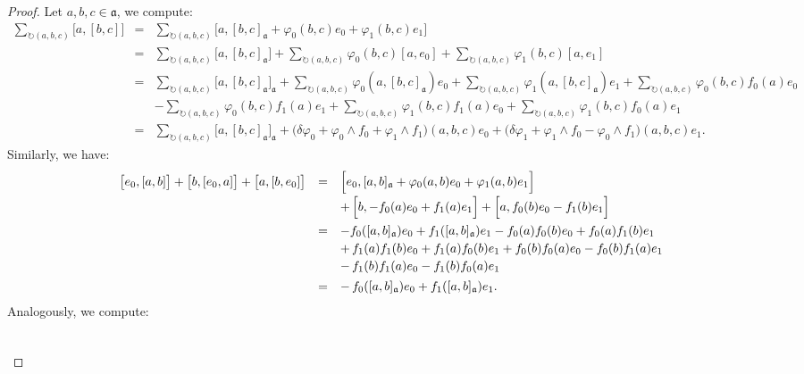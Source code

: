 \documentclass[10pt,a4paper]{amsart}
\newcommand{\ai}{\mathfrak{a}}
\begin{document}
\begin{proof}
	Let $a,b,c\in\ai$, we compute:
	\begin{eqnarray*}
		\sum_{\circlearrowright (a,b,c)} \big[a,[b,c]\big]&=&\sum_{\circlearrowright (a,b,c)} \Big[a,[b,c]_\ai+\varphi_0(b,c)e_0+\varphi_1(b,c)e_1\Big]\\
		&=&\sum_{\circlearrowright (a,b,c)} \big[a,[b,c]_\ai\big]+\sum_{\circlearrowright (a,b,c)} \varphi_0(b,c)[a,e_0]+\sum_{\circlearrowright (a,b,c)} \varphi_1(b,c)[a,e_1]\\
		&=&\sum_{\circlearrowright (a,b,c)} \big[a,[b,c]_\ai\big]_\ai+\sum_{\circlearrowright (a,b,c)} \varphi_0(a,[b,c]_\ai)e_0+\sum_{\circlearrowright (a,b,c)} \varphi_1(a,[b,c]_\ai)e_1+\sum_{\circlearrowright (a,b,c)}\varphi_0(b,c)f_0(a)e_0\\
		&&-\sum_{\circlearrowright (a,b,c)}\varphi_0(b,c)f_1(a)e_1+\sum_{\circlearrowright (a,b,c)}\varphi_1(b,c)f_1(a)e_0+\sum_{\circlearrowright (a,b,c)}\varphi_1(b,c)f_0(a)e_1\\
		&=&\sum_{\circlearrowright (a,b,c)} \big[a,[b,c]_\ai\big]_\ai+\big(\delta\varphi_0+\varphi_0\wedge f_0+\varphi_1\wedge f_1\big)(a,b,c)e_0+\big(\delta\varphi_1+\varphi_1\wedge f_0-\varphi_0\wedge f_1\big)(a,b,c)e_1.
	\end{eqnarray*}
	Similarly, we have:
	\begin{equation*}
\begin{array}{r c l}\vspace{0.75mm}
\big[e_0,[a,b]\big]+\big[b,[e_0,a]\big]+\big[a,[b,e_0]\big]&=&\Big[e_0,[a,b]_\ai+\varphi_0(a,b)e_0+\varphi_1(a,b)e_1\Big]\\\vspace{1.5mm}
		&&+\,\Big[b,-f_0(a)e_0+f_1(a)e_1\Big]+\Big[a,f_0(b)e_0-f_1(b)e_1\Big]\\\vspace{0.75mm}
		&=&-f_0([a,b]_\ai)e_0+f_1([a,b]_\ai)e_1-f_0(a)f_0(b)e_0+f_0(a)f_1(b)e_1\\\vspace{0.75mm}
		&&+\,f_1(a)f_1(b)e_0+f_1(a)f_0(b)e_1+f_0(b)f_0(a)e_0-f_0(b)f_1(a)e_1\\\vspace{1.5mm}
		&&-\,f_1(b)f_1(a)e_0-f_1(b)f_0(a)e_1\\
		&=&-\,f_0([a,b]_\ai)e_0+f_1([a,b]_\ai)e_1.
	\end{array}
\end{equation*}
	Analogously, we compute:
	\begin{equation*}
		\begin{array}{r c l}\vspace{0.75mm}

\end{array}
\end{equation*}
\end{proof}
\end{document}
